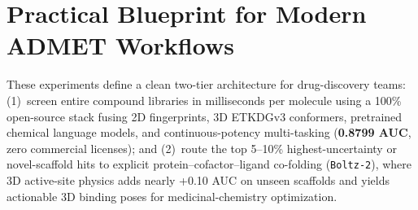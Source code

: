 \documentclass[11pt]{article}
\begin{document}
\section{Practical Blueprint for Modern ADMET Workflows}
These experiments define a clean two-tier architecture for drug-discovery teams: (1)~screen entire compound libraries in milliseconds per molecule using a 100\% open-source stack fusing 2D fingerprints, 3D ETKDGv3 conformers, pretrained chemical language models, and continuous-potency multi-tasking (\textbf{0.8799 AUC}, zero commercial licenses); and (2)~route the top 5--10\% highest-uncertainty or novel-scaffold hits to explicit protein--cofactor--ligand co-folding (\texttt{Boltz-2}), where 3D active-site physics adds nearly +0.10 AUC on unseen scaffolds and yields actionable 3D binding poses for medicinal-chemistry optimization.
\end{document}
